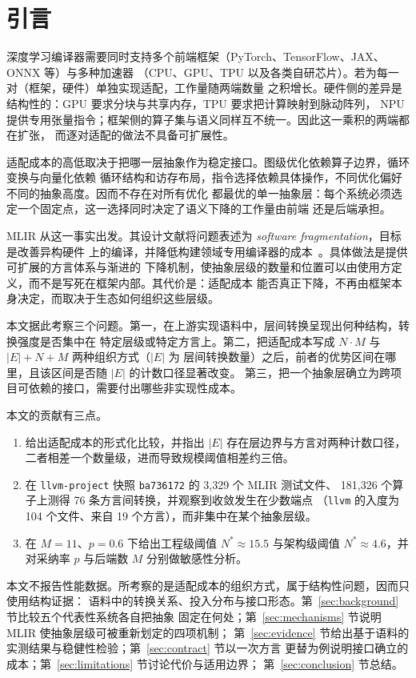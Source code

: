 
\section{引言}
\label{sec:intro}

深度学习编译器需要同时支持多个前端框架（PyTorch、TensorFlow、JAX、ONNX 等）与多种加速器
（CPU、GPU、TPU 以及各类自研芯片）。若为每一对（框架，硬件）单独实现适配，工作量随两端数量
之积增长。硬件侧的差异是结构性的：GPU 要求分块与共享内存，TPU 要求把计算映射到脉动阵列，
NPU 提供专用张量指令；框架侧的算子集与语义同样互不统一。因此这一乘积的两端都在扩张，
而逐对适配的做法不具备可扩展性。

适配成本的高低取决于把哪一层抽象作为稳定接口。图级优化依赖算子边界，循环变换与向量化依赖
循环结构和访存布局，指令选择依赖具体操作，不同优化偏好不同的抽象高度。因而不存在对所有优化
都最优的单一抽象层：每个系统必须选定一个固定点，这一选择同时决定了语义下降的工作量由前端
还是后端承担。

MLIR 从这一事实出发。其设计文献将问题表述为 \emph{software fragmentation}，目标是改善异构硬件
上的编译，并降低构建领域专用编译器的成本~\cite{mlir21}。具体做法是提供可扩展的方言体系与渐进的
下降机制，使抽象层级的数量和位置可以由使用方定义，而不是写死在框架内部。其代价是：适配成本
能否真正下降，不再由框架本身决定，而取决于生态如何组织这些层级。

本文据此考察三个问题。第一，在上游实现语料中，层间转换呈现出何种结构，转换强度是否集中在
特定层级或特定方言上。第二，把适配成本写成 $N\cdot M$ 与 $|E|+N+M$ 两种组织方式（$|E|$ 为
层间转换数量）之后，前者的优势区间在哪里，且该区间是否随 $|E|$ 的计数口径显著改变。
第三，把一个抽象层确立为跨项目可依赖的接口，需要付出哪些非实现性成本。

本文的贡献有三点。

\begin{enumerate}
  \item 给出适配成本的形式化比较，并指出 $|E|$ 存在层边界与方言对两种计数口径，
        二者相差一个数量级，进而导致规模阈值相差约三倍。
  \item 在 \texttt{llvm-project} 快照 \texttt{ba736172} 的 3,329 个 MLIR 测试文件、
        181,326 个算子上测得 76 条方言间转换，并观察到收敛发生在少数端点
        （\texttt{llvm} 的入度为 104 个文件、来自 19 个方言），而非集中在某个抽象层级。
  \item 在 $M=11$、$p=0.6$ 下给出工程级阈值 $N^{*}\approx 15.5$ 与架构级阈值
        $N^{*}\approx 4.6$，并对采纳率 $p$ 与后端数 $M$ 分别做敏感性分析。
\end{enumerate}

本文不报告性能数据。所考察的是适配成本的组织方式，属于结构性问题，因而只使用结构证据：
语料中的转换关系、投入分布与接口形态。第~\ref{sec:background} 节比较五个代表性系统各自把抽象
固定在何处；第~\ref{sec:mechanisms} 节说明 MLIR 使抽象层级可被重新划定的四项机制；
第~\ref{sec:evidence} 节给出基于语料的实测结果与稳健性检验；第~\ref{sec:contract} 节以一次方言
更替为例说明接口确立的成本；第~\ref{sec:limitations} 节讨论代价与适用边界；
第~\ref{sec:conclusion} 节总结。
